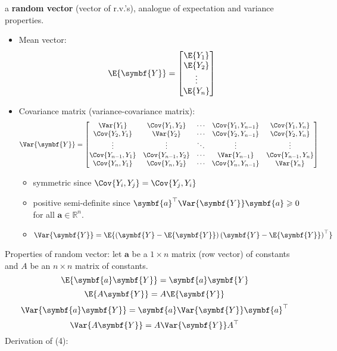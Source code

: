 a \textbf{random vector} (vector of r.v.'s), analogue of
expectation and variance properties.
\begin{itemize}
    \item Mean vector:
          \[ \E{\symbf{Y}}=\begin{bmatrix}
                  \E{Y_1} \\
                  \E{Y_2} \\
                  \vdots  \\
                  \E{Y_n}
              \end{bmatrix} \]
    \item Covariance matrix (variance-covariance matrix):
          \[ \Var{\symbf{Y}}=\begin{bmatrix}
                  \Var{Y_1}         & \Cov{Y_1,Y_2}     & \cdots & \Cov{Y_1,Y_{n-1}} & \Cov{Y_1,Y_n}     \\
                  \Cov{Y_2,Y_1}     & \Var{Y_2}         & \cdots & \Cov{Y_2,Y_{n-1}} & \Cov{Y_2,Y_n}     \\
                  \vdots            & \vdots            & \ddots & \vdots            & \vdots            \\
                  \Cov{Y_{n-1},Y_1} & \Cov{Y_{n-1},Y_2} & \cdots & \Var{Y_{n-1}}     & \Cov{Y_{n-1},Y_n} \\
                  \Cov{Y_n,Y_1}     & \Cov{Y_n,Y_2}     & \cdots & \Cov{Y_n,Y_{n-1}} & \Var{Y_n}
              \end{bmatrix} \]
          \begin{itemize}
              \item symmetric since $ \Cov{Y_i,Y_j}=\Cov{Y_j,Y_i} $
              \item positive semi-definite since
                    $ \symbf{a}^\top\Var{\symbf{Y}}\symbf{a}\geqslant 0 $
                    for all $ \symbf{a}\in\mathbb{R}^n $.
              \item $ \Var{\symbf{Y}}=
                        \E{\left( \symbf{Y}-\E{\symbf{Y}} \right)\left( \symbf{Y}-\E{\symbf{Y}} \right)^\top} $
          \end{itemize}
\end{itemize}
Properties of random vector: let $ \symbf{a} $ be a $ 1\times n $
matrix (row vector) of constants and $ A $ be an $ n\times n $
matrix of constants.
\[ \E{\symbf{a}\symbf{Y}}=\symbf{a}\symbf{Y} \]
\[ \E{A\symbf{Y}}=A\E{\symbf{Y}} \]
\[ \Var{\symbf{a}\symbf{Y}}=\symbf{a}\Var{\symbf{Y}}\symbf{a}^\top \]
\[ \Var{A\symbf{Y}}=A\Var{\symbf{Y}}A^\top \]
Derivation of (4):

